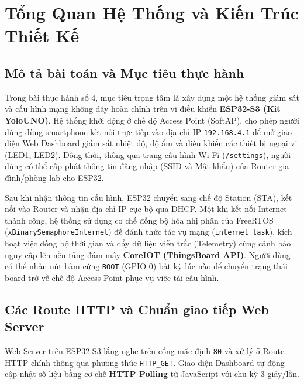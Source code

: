 \setcounter{table}{0}
\setcounter{figure}{0}

\section{Tổng Quan Hệ Thống và Kiến Trúc Thiết Kế}

\subsection{Mô tả bài toán và Mục tiêu thực hành}
Trong bài thực hành số 4, mục tiêu trọng tâm là xây dựng một hệ thống giám sát và cấu hình mạng không dây hoàn chỉnh trên vi điều khiển \textbf{ESP32-S3 (Kit YoloUNO)}. Hệ thống khởi động ở chế độ Access Point (SoftAP), cho phép người dùng dùng smartphone kết nối trực tiếp vào địa chỉ IP \texttt{192.168.4.1} để mở giao diện Web Dashboard giám sát nhiệt độ, độ ẩm và điều khiển các thiết bị ngoại vi (LED1, LED2). Đồng thời, thông qua trang cấu hình Wi-Fi (\texttt{/settings}), người dùng có thể cấp phát thông tin đăng nhập (SSID và Mật khẩu) của Router gia đình/phòng lab cho ESP32.

Sau khi nhận thông tin cấu hình, ESP32 chuyển sang chế độ Station (STA), kết nối vào Router và nhận địa chỉ IP cục bộ qua DHCP. Một khi kết nối Internet thành công, hệ thống sử dụng cơ chế đồng bộ hóa nhị phân của FreeRTOS (\texttt{xBinarySemaphoreInternet}) để đánh thức tác vụ mạng (\texttt{internet\_task}), kích hoạt việc đồng bộ thời gian và đẩy dữ liệu viễn trắc (Telemetry) cùng cảnh báo nguy cấp lên nền tảng đám mây \textbf{CoreIOT (ThingsBoard API)}. Người dùng có thể nhấn nút bấm cứng \texttt{BOOT} (GPIO 0) bất kỳ lúc nào để chuyển trạng thái board trở về chế độ Access Point phục vụ việc tái cấu hình.

\subsection{Các Route HTTP và Chuẩn giao tiếp Web Server}
Web Server trên ESP32-S3 lắng nghe trên cổng mặc định \texttt{80} và xử lý 5 Route HTTP chính thông qua phương thức \texttt{HTTP\_GET}. Giao diện Dashboard tự động cập nhật số liệu bằng cơ chế \textbf{HTTP Polling} từ JavaScript với chu kỳ 3 giây/lần.

